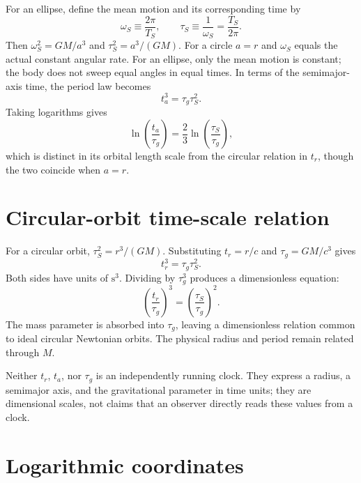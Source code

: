 \documentclass[12pt]{article}
\begin{document}
For an ellipse, define the mean motion and its corresponding time by
\begin{equation}
  \omega_S\equiv\frac{2\pi}{T_S},
  \qquad
  \tau_S\equiv\frac{1}{\omega_S}=\frac{T_S}{2\pi}.
  \label{eq:mean-motion}
\end{equation}
Then $\omega_S^2=GM/a^3$ and $\tau_S^2=a^3/(GM)$. For a circle $a=r$ and $\omega_S$ equals the actual constant angular rate. For an ellipse, only the mean motion is constant; the body does not sweep equal angles in equal times. In terms of the semimajor-axis time, the period law becomes
\begin{equation}
  t_a^3=\tau_g\tau_S^2.
  \label{eq:elliptical-time-law}
\end{equation}
Taking logarithms gives
\begin{equation}
  \ln\!\left(\frac{t_a}{\tau_g}\right)
  =\frac{2}{3}\ln\!\left(\frac{\tau_S}{\tau_g}\right),
  \label{eq:elliptical-log-law}
\end{equation}
which is distinct in its orbital length scale from the circular relation in $t_r$, though the two coincide when $a=r$.

\section{Circular-orbit time-scale relation}
\label{sec:times}

For a circular orbit, $\tau_S^2=r^3/(GM)$. Substituting $t_r=r/c$ and $\tau_g=GM/c^3$ gives
\begin{equation}
  t_r^3=\tau_g\tau_S^2.
  \label{eq:time-law}
\end{equation}
Both sides have units of $\mathrm{s^3}$. Dividing by $\tau_g^3$ produces a dimensionless equation:
\begin{equation}
  \left(\frac{t_r}{\tau_g}\right)^3
  =\left(\frac{\tau_S}{\tau_g}\right)^2.
  \label{eq:dimensionless-law}
\end{equation}
The mass parameter is absorbed into $\tau_g$, leaving a dimensionless relation common to ideal circular Newtonian orbits. The physical radius and period remain related through $M$.

Neither $t_r$, $t_a$, nor $\tau_g$ is an independently running clock. They express a radius, a semimajor axis, and the gravitational parameter in time units; they are dimensional scales, not claims that an observer directly reads these values from a clock.

\section{Logarithmic coordinates}
\label{sec:logs}
\end{document}
